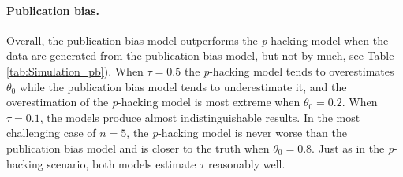 \documentclass{article}
\theoremstyle{plain}
\theoremstyle{definition}
\begin{document}
\paragraph{Publication bias.} 
Overall, the publication bias model outperforms the \textit{p}-hacking model when the data are generated from the publication bias model, but not by much, see Table \ref{tab:Simulation_pb}). When $\tau = 0.5$ the \textit{p}-hacking model tends to overestimates $\theta_0$ while the publication bias model tends to underestimate it, and the overestimation of the \textit{p}-hacking model is most extreme when $\theta_0 = 0.2$. When $\tau = 0.1$, the models produce almost indistinguishable results. In the most challenging case of $n=5$, the \textit{p}-hacking model is never worse than the publication bias model and is closer to the truth when $\theta_0 = 0.8$. Just as in the \textit{p}-hacking scenario, both models estimate $\tau$ reasonably well.
\end{document}
